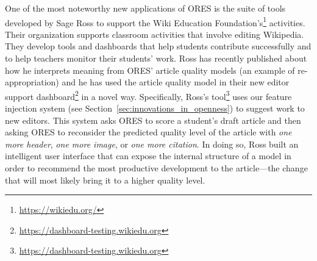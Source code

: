 One of the most noteworthy new applications of ORES is the suite of tools developed by Sage Ross to support the Wiki Education Foundation's\footnote{\url{https://wikiedu.org/}} activities.  Their organization supports classroom activities that involve editing Wikipedia.  They develop tools and dashboards that help students contribute successfully and to help teachers monitor their students' work.  Ross has recently published about how he interprets meaning from ORES' article quality models \cite{ross2016visualizing} (an example of re-appropriation) and he has used the article quality model in their new editor support dashboard\footnote{\url{https://dashboard-testing.wikiedu.org}} in a novel way.  Specifically, Ross's tool\footnote{\url{https://dashboard-testing.wikiedu.org}} uses our feature injection system (see Section~\ref{sec:innovations_in_openness}) to suggest work to new editors.  This system asks ORES to score a student's draft article and then asking ORES to reconsider the predicted quality level of the article with \emph{one more header}, \emph{one more image}, or \emph{one more citation}. In doing so, Ross built an intelligent user interface that can expose the internal structure of a model in order to recommend the most productive development to the article---the change that will most likely bring it to a higher quality level.
